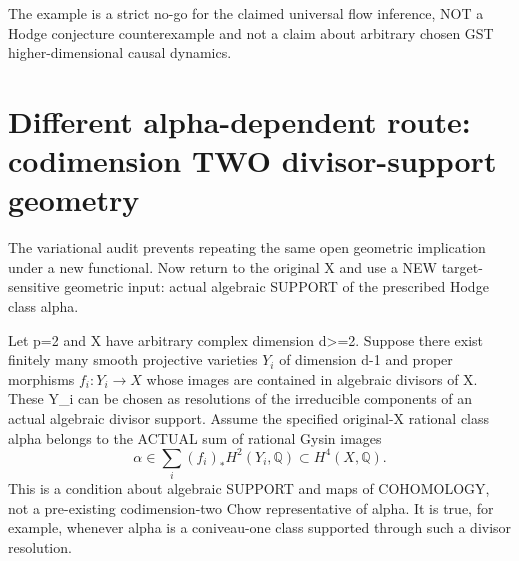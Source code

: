 \documentclass[11pt]{article}
\begin{document}
The example is a strict no-go
for the claimed universal
flow inference, NOT a Hodge
conjecture counterexample and
not a claim about arbitrary
chosen GST higher-dimensional
causal dynamics.

\section{Different alpha-dependent route: codimension TWO divisor-support geometry}
The variational audit prevents repeating the
same open geometric implication under a new
functional. Now return to the original X
and use a NEW target-sensitive geometric input:
actual algebraic SUPPORT of the prescribed
Hodge class alpha.

Let p=2 and X have arbitrary complex dimension d>=2.
Suppose there exist finitely many smooth projective
varieties \(Y_i\) of dimension d-1 and
proper morphisms \(f_i:Y_i\to X\)
whose images are contained in algebraic
divisors of X. These Y_i can be chosen as
resolutions of the irreducible components
of an actual algebraic divisor support.
Assume the specified original-X
rational class alpha belongs to the
ACTUAL sum of rational Gysin images
\[
 \boxed{
 \alpha\in\sum_i
 (f_i)_*H^2(Y_i,\mathbb Q)
       \subset H^4(X,\mathbb Q).
 }                                                       \tag{5}
\]
This is a condition about algebraic SUPPORT
and maps of COHOMOLOGY, not a pre-existing
codimension-two Chow representative of alpha.
It is true, for example, whenever alpha is
a coniveau-one class supported through such a
divisor resolution.
\end{document}
